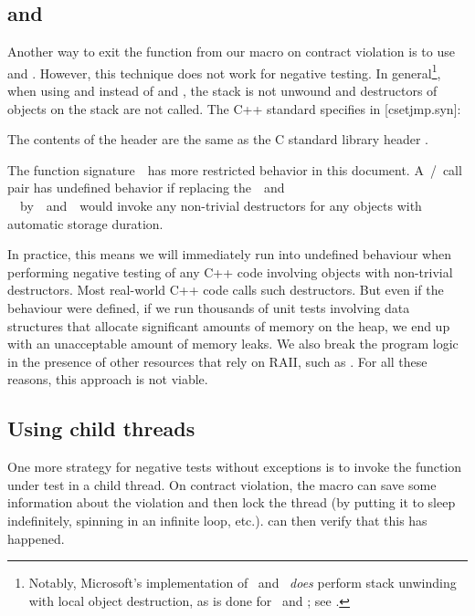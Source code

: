 \subsection{ and }

Another way to exit the function from our  macro on contract violation is to use  and . However, this technique does not work for negative testing. In general\footnote{Notably, Microsoft's implementation of   and  \emph{does} perform stack unwinding with local object destruction, as is done for  and ; see \cite{MSVCDocLongjmp}.}, when using  and  instead of  and , the stack is not unwound and destructors of objects on the stack are not called. The C++ standard specifies in [csetjmp.syn]:

\begin{adjustwidth}{0.5cm}{0.5cm}
The contents of the header  are the same as the C standard library header .

The function signature  has more restricted behavior in this document. A / call pair has undefined behavior if replacing the  and \\  by  and  would invoke any non-trivial destructors for any objects with automatic storage duration.
\end{adjustwidth}

In practice, this means we will immediately run into undefined behaviour when performing negative testing of any C++ code involving objects with non-trivial destructors. Most real-world C++ code calls such destructors. But even if the behaviour were defined, if we run thousands of unit tests involving data structures that allocate significant amounts of memory on the heap, we end up with an unacceptable amount of memory leaks. We also break the program logic in the presence of other resources that rely on RAII, such as . For all these reasons, this approach is not viable.

\subsection{Using child threads}

One more strategy for negative tests without exceptions is to invoke the function under test in a child thread. On contract violation, the  macro can save some information about the violation and then lock the thread (by putting it to sleep indefinitely, spinning in an infinite loop, etc.).  can then verify that this has happened.

